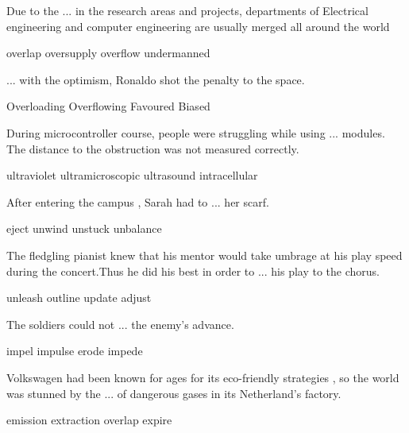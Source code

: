 \documentclass{exam}
\begin{document}
\begin{questions}
\question Due to the ... in the research areas and projects, departments of Electrical engineering and computer engineering are usually merged all around the world
\\
\begin{oneparchoices}
\correctchoice overlap
\choice oversupply
\choice overflow
\choice undermanned
\end{oneparchoices}

\question ... with the optimism, Ronaldo shot the penalty to the  space.\\
\begin{oneparchoices}
\choice Overloading
\correctchoice Overflowing
\choice Favoured
\choice Biased
\end{oneparchoices}

\question During microcontroller course, people were struggling while using ... modules.  The distance to the obstruction was not measured correctly.\\
\begin{oneparchoices}
\choice ultraviolet
\choice ultramicroscopic
\correctchoice ultrasound
\choice intracellular
\end{oneparchoices}

\question After entering the campus , Sarah had to ...  her scarf.\\
\begin{oneparchoices}
\choice eject
\correctchoice unwind
\choice unstuck
\choice unbalance
\end{oneparchoices}

\question The fledgling pianist knew that his mentor would take umbrage at his play speed during the concert.Thus he did his best in order to ... his play to the chorus.\\
\begin{oneparchoices}
\choice unleash
\choice outline
\choice update
\correctchoice adjust
\end{oneparchoices}

\question The soldiers could not ... the enemy's advance.\\
\begin{oneparchoices}
 \choice impel
 \choice impulse
 \choice erode 
 \correctchoice impede
\end{oneparchoices}

\question  Volkswagen had been known for ages for its eco-friendly strategies , so the world was stunned by the ... of dangerous gases in its Netherland's factory.\\
\begin{oneparchoices}
\correctchoice emission
\choice extraction
\choice overlap
\choice expire
\end{oneparchoices}




\end{questions}
\end{document}
